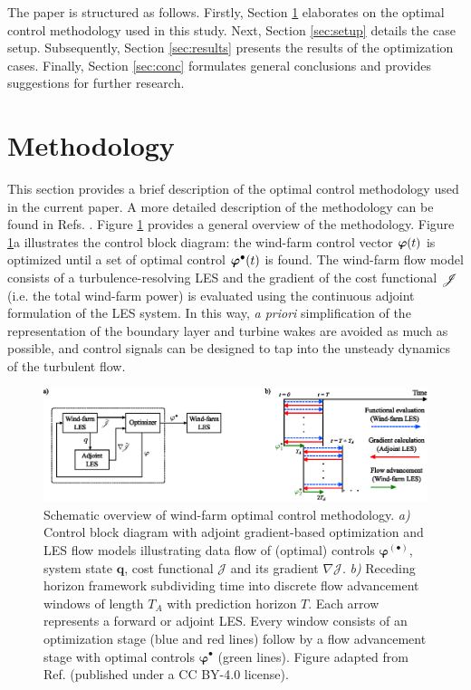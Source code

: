 \documentclass[a4paper]{jpconf}
\begin{document}
The paper is structured as follows. Firstly, Section \ref{sec:meth} elaborates on the optimal control methodology used in this study. Next, Section \ref{sec:setup} details the case setup. Subsequently, Section \ref{sec:results} presents the results of the optimization cases. Finally, Section \ref{sec:conc} formulates general conclusions and provides
suggestions for further research. 

 \section{Methodology} \label{sec:meth}

This section provides a brief description of the optimal control methodology used in the current paper. A more detailed description of the
methodology can be found in Refs. \cite{goit, munters, muntersenergies}. Figure \ref{fig:meth} provides a general overview of the methodology. Figure
\ref{fig:meth}a illustrates the control block diagram: the wind-farm control vector $\boldsymbol{\varphi}(t)$ is optimized until a set of optimal control
$\boldsymbol{\varphi}^{\bullet}(t)$ is found. The wind-farm flow model consists of a turbulence-resolving LES and the gradient of the 
cost functional $\mathscr{J}$ (i.e. the total wind-farm power) is evaluated using the continuous adjoint formulation of the LES system. In this way,
\emph{a priori} simplification of the representation of the boundary layer and turbine wakes are avoided as much as possible, and control signals can
be designed to tap into the unsteady dynamics of the turbulent flow.

\begin{figure}
	\includegraphics[width=\textwidth]{Torque18/figure1}
	\caption{Schematic overview of wind-farm optimal control methodology. \emph{a)} Control block diagram with adjoint gradient-based optimization
	and LES flow models illustrating data flow of (optimal) controls $\boldsymbol{\varphi}^{(\bullet)}$, system state $\boldsymbol{q}$, cost
	functional $\mathscr{J}$ and its gradient $\nabla \mathscr{J}$. \emph{b)} Receding horizon framework subdividing time into discrete flow
	advancement windows of length $T_A$ with prediction horizon $T$. Each arrow represents a forward or adjoint LES. Every window consists of an
	optimization stage (blue and red lines) follow by a flow advancement stage with optimal controls $\boldsymbol{\varphi}^{\bullet}$ (green
	lines). Figure adapted from Ref. \cite{munterswes} (published under a CC BY-4.0 license). \label{fig:meth} }
\end{figure}
\end{document}
